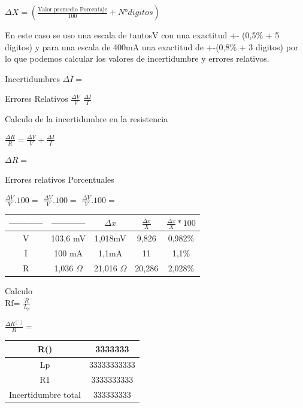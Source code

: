\documentclass[12pt, letterpaper]{article}
\begin{document}
\singlespacing
$\Delta X=( \frac{\text{Valor promedio  Porcentaje}}{100} + N° digitos)$\singlespacing
\singlespacing

En este caso se uso una escala de tantosV con una exactitud +- (0,5\% + 5 digitos) y para una escala de 400mA una exactitud de +-(0,8\% + 3 digitos)
por lo que podemos calcular los valores de incertidumbre y errores relativos.
\singlespacing\Delta  

\item  Incertidumbres\singlespacing
$\Delta I=$\singlespacing
\item Errores Relativos\singlespacing
$\frac{\Delta V}{V}$\singlespacing
$\frac{\Delta I}{I}$ \singlespacing
\item Calculo de la incertidumbre en la resistencia\singlespacing

$\frac{\Delta R}{R} =\frac{\Delta V}{V} + \frac{\Delta I}{I}$ \singlespacing

$\Delta R=$\singlespacing

\item Errores relativos Porcentuales\singlespacing

$\frac{\Delta V}{V} . 100=$\newline
$\frac{\Delta V}{V} . 100=$\newline
$\frac{\Delta V}{V} . 100=$\newline
 
\begin{center}
	\begin{tabular}{|c|c|c|c|c|}
	\hline
	----------- & ----------- & $\Delta x$  & $\frac{\Delta x}{X}$  & $ \frac{\Delta x}{X}*100$ \\ \hline
	V           & 103,6 mV    & 1,018mV & 9,826      & 0,982\%        \\ \hline
	I           & 100 mA      & 1,1mA   & 11         & 1,1\%          \\ \hline
	R           & 1,036    $\Omega$    & 21,016 $\Omega$  & 20,286     & 2,028\%        \\ \hline
	\end{tabular}
	\end{center}

\singlespacing
\item Calculo\\ 

Rf= $\frac{R}{L_{p}}$
\singlespacing

$\frac{\Delta R^[´]}{R}=$ 

\singlespacing

\begin{center}
\begin{tabular}{|c|c|}
\hline
R()                 & 3333333     \\ \hline
Lp                  & 33333333333 \\ \hline
R1                  & 3333333333  \\ \hline
Incertidumbre total & 333333333   \\ \hline
\end{tabular}
\end{center}
\end{document}
